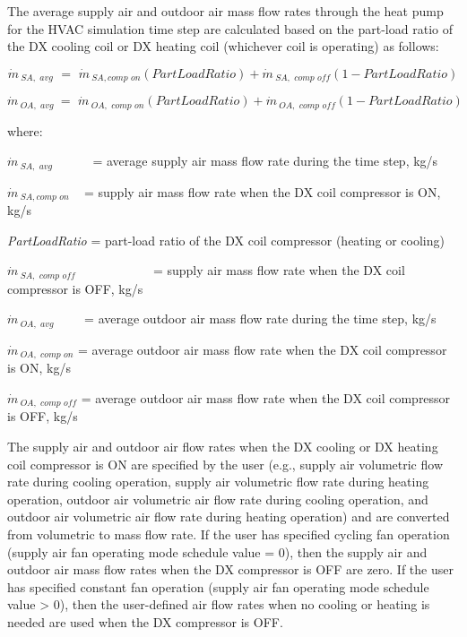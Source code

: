 The average supply air and outdoor air mass flow rates through the heat pump for the HVAC simulation time step are calculated based on the part-load ratio of the DX cooling coil or DX heating coil (whichever coil is operating) as follows:

\begin{equation}
\dot m{\,_{SA,\,\,avg}}\,\, = \,\,\dot m{\,_{SA,comp\,\,on}}\left( {PartLoadRatio} \right) + \dot m{\,_{SA,\,\,comp\,\,off}}\left( {1 - PartLoadRatio} \right)
\end{equation}

\begin{equation}
\dot m{\,_{OA,\,\,avg\,\,}} = \,\,\dot m{\,_{OA,\,\,comp\,\,on}}\left( {PartLoadRatio} \right) + \dot m{\,_{OA,\,\,comp\,\,off}}\left( {1 - PartLoadRatio} \right)
\end{equation}

where:

\(\dot m{\,_{SA,\,\,avg}}\) ~~~~~ = average supply air mass flow rate during the time step, kg/s

\(\dot m{\,_{SA,comp\,\,on}}\) ~ = supply air mass flow rate when the DX coil compressor is ON, kg/s

\emph{PartLoadRatio} = part-load ratio of the DX coil compressor (heating or cooling)

\(\dot m{\,_{SA,\,\,comp\,\,off}}\) ~~~~~~~~~~~ = supply air mass flow rate when the DX coil compressor is OFF, kg/s

\(\dot m{\,_{OA,\,\,avg\,\,}}\) ~~~ = average outdoor air mass flow rate during the time step, kg/s

\(\dot m{\,_{OA,\,\,comp\,\,on}}\) = average outdoor air mass flow rate when the DX coil compressor is ON, kg/s

\(\dot m{\,_{OA,\,\,comp\,\,off}}\) = average outdoor air mass flow rate when the DX coil compressor is OFF, kg/s

The supply air and outdoor air flow rates when the DX cooling or DX heating coil compressor is ON are specified by the user (e.g., supply air volumetric flow rate during cooling operation, supply air volumetric flow rate during heating operation, outdoor air volumetric air flow rate during cooling operation, and outdoor air volumetric air flow rate during heating operation) and are converted from volumetric to mass flow rate. If the user has specified cycling fan operation (supply air fan operating mode schedule value = 0), then the supply air and outdoor air mass flow rates when the DX compressor is OFF are zero. If the user has specified constant fan operation (supply air fan operating mode schedule value \textgreater{} 0), then the user-defined air flow rates when no cooling or heating is needed are used when the DX compressor is OFF.


